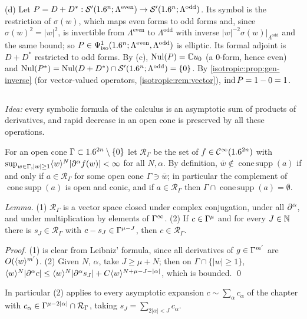 (d) Let $P=D+D^*:\mathcal{S}'(1.6^n;\Lambda^{\mathrm{even}})\to\mathcal{S}'(1.6^n;\Lambda^{\mathrm{odd}})$.
Its symbol is the restriction of $\sigma(w)$, which maps even forms to odd forms
and, since $\sigma(w)^2=|w|^2$, is invertible from $\Lambda^{\mathrm{even}}$ to
$\Lambda^{\mathrm{odd}}$ with inverse $|w|^{-2}\sigma(w)|_{\Lambda^{\mathrm{odd}}}$ and
the same bound; so $P\in\Psi^{1}_{\mathrm{iso}}(1.6^n;\Lambda^{\mathrm{even}},\Lambda^{\mathrm{odd}})$
is elliptic. Its formal adjoint is $D+D^*$ restricted to odd forms. By (c),
$\operatorname{Nul}(P)=\mathbb{C} u_0$ (a $0$-form, hence even) and $\operatorname{Nul}(P^*)=\operatorname{Nul}(D+D^*)\cap\mathcal{S}'(1.6^n;\Lambda^{\mathrm{odd}})=\{0\}$.
By \cref{isotropic:prop:gen-inverse} (for vector-valued operators,
\cref{isotropic:rem:vector}), $\operatorname{ind} P=1-0=1$.

\subsection*{}

\emph{Idea:} every symbolic formula of the calculus is an asymptotic sum of
products of derivatives, and rapid decrease in an open cone is preserved by all
these operations.

For an open cone $\Gamma\subset1.6^{2n}\setminus\{0\}$ let $\mathcal R_\Gamma$ be the set
of $f\in\mathcal{C}^\infty(1.6^{2n})$ with $\sup_{w\in\Gamma,|w|\ge1}\langle w\rangle^N|\partial^\alpha f(w)|<\infty$
for all $N,\alpha$. By definition, $\bar w\notin\operatorname{cone\,supp}(a)$ if and
only if $a\in\mathcal R_\Gamma$ for some open cone $\Gamma\ni\bar w$; in particular the
complement of $\operatorname{cone\,supp}(a)$ is open and conic, and if
$a\in\mathcal R_\Gamma$ then $\Gamma\cap\operatorname{cone\,supp}(a)=\emptyset$.

\emph{Lemma.} (1) $\mathcal R_\Gamma$ is a vector space closed under complex
conjugation, under all $\partial^\alpha$, and under multiplication by elements of
$\Gamma^{\infty}$. (2) If $c\in\Gamma^{\mu}$ and for every $J\in\mathbb{N}$ there is $s_J\in\mathcal R_\Gamma$ with
$c-s_J\in\Gamma^{\mu-J}$, then $c\in\mathcal R_\Gamma$.

\emph{Proof.} (1) is clear from Leibniz' formula, since all derivatives of
$g\in\Gamma^{m'}$ are $O(\langle w\rangle^{m'})$. (2) Given $N$, $\alpha$, take $J\ge\mu+N$;
then on $\Gamma\cap\{|w|\ge1\}$,
$\langle w\rangle^N|\partial^\alpha c|\le\langle w\rangle^N|\partial^\alpha s_J|+C\langle w\rangle^{N+\mu-J-|\alpha|}$,
which is bounded. \qed

In particular (2) applies to every asymptotic expansion
$c\sim\sum_\alpha c_\alpha$ of the chapter with $c_\alpha\in\Gamma^{\mu-2|\alpha|}\cap\mathcal R_\Gamma$,
taking $s_J=\sum_{2|\alpha|<J}c_\alpha$.


